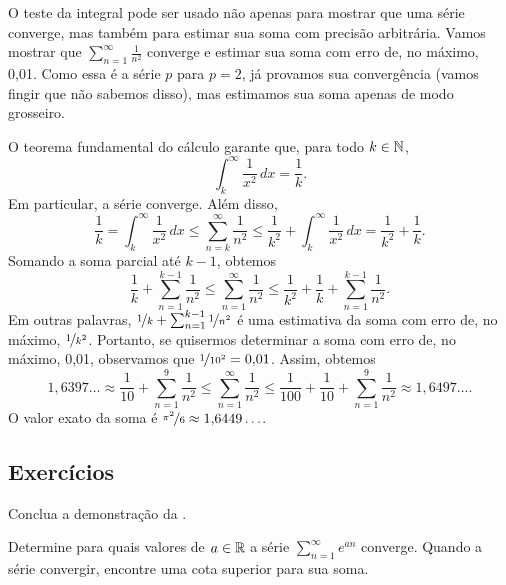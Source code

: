 \begin{example}
O teste da integral pode ser usado não apenas para mostrar que uma série
converge, mas também para estimar sua soma com precisão arbitrária.
Vamos mostrar que $\sum_{n=1}^\infty \frac{1}{n^2}$ converge e estimar sua
soma com erro de, no máximo, 0,01. Como essa é a série $p$ para $p=2$, já
provamos sua convergência (vamos fingir que não sabemos disso), mas estimamos
sua soma apenas de modo grosseiro.

O teorema fundamental do cálculo garante que, para todo $k\in{\mathbb{N}}$,
\begin{equation*}
\int_{k}^\infty \frac{1}{x^2}\,dx = \frac{1}{k} .
\end{equation*}
Em particular, a série converge. Além disso,
\begin{equation*}
\frac{1}{k} = \int_k^\infty \frac{1}{x^2}\,dx
\leq
\sum_{n=k}^\infty \frac{1}{n^2}
\leq
\frac{1}{k^2}
+
\int_k^\infty \frac{1}{x^2}\,dx
=
\frac{1}{k^2}
+
\frac{1}{k} .
\end{equation*}
Somando a soma parcial até $k-1$, obtemos
\begin{equation*}
\frac{1}{k} + \sum_{n=1}^{k-1} \frac{1}{n^2}
\leq
\sum_{n=1}^\infty \frac{1}{n^2}
\leq
\frac{1}{k^2}
+
\frac{1}{k} + \sum_{n=1}^{k-1} \frac{1}{n^2} .
\end{equation*}
Em outras palavras, $\nicefrac{1}{k} + \sum_{n=1}^{k-1} \nicefrac{1}{n^2}$
é uma estimativa da soma com erro de, no máximo, $\nicefrac{1}{k^2}$.
Portanto, se quisermos determinar a soma com erro de, no máximo, 0,01,
observamos que $\nicefrac{1}{{10}^2}=0{,}01$. Assim, obtemos
\begin{equation*}
1{,}6397\ldots
\approx
\frac{1}{10} + \sum_{n=1}^{9} \frac{1}{n^2}
\leq
\sum_{n=1}^\infty \frac{1}{n^2}
\leq
\frac{1}{100}
+
\frac{1}{10} + \sum_{n=1}^{9} \frac{1}{n^2}
\approx
1{,}6497\ldots .
\end{equation*}
O valor exato da soma é $\nicefrac{\pi^2}{6} \approx 1{,}6449\ldots$.
\end{example}

\subsection{Exercícios}

\begin{exercise}
Conclua a demonstração da .
\end{exercise}

\begin{exercise}
Determine para quais valores de $a\in{\mathbb{R}}$ a série $\sum_{n=1}^\infty e^{an}$
converge. Quando a série convergir, encontre uma cota superior para sua soma.
\end{exercise}


